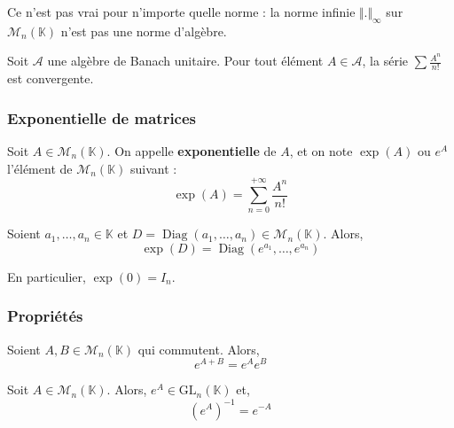   \begin{cexample}
    Ce n'est pas vrai pour n'importe quelle norme : la norme infinie $\Vert . \Vert_\infty$ sur $\mathcal{M}_n(\mathbb{K})$ n'est pas une norme d'algèbre.
  \end{cexample}


  \begin{proposition}
    Soit $\mathcal{A}$ une algèbre de Banach unitaire. Pour tout élément $A \in \mathcal{A}$, la série $\sum \frac{A^n}{n!}$ est convergente.
  \end{proposition}

  \subsubsection{Exponentielle de matrices}


  \begin{definition}
    Soit $A \in \mathcal{M}_n(\mathbb{K})$. On appelle \textbf{exponentielle} de $A$, et on note $\exp(A)$ ou $e^A$ l'élément de $\mathcal{M}_n(\mathbb{K})$ suivant :
    \[ \exp(A) = \sum_{n=0}^{+\infty} \frac{A^n}{n!} \]
  \end{definition}


  \begin{example}
    Soient $a_1, \dots, a_n \in \mathbb{K}$ et $D = \operatorname{Diag}(a_1, \dots, a_n) \in \mathcal{M}_n(\mathbb{K})$. Alors,
    \[ \exp(D) = \operatorname{Diag}(e^{a_1}, \dots, e^{a_n}) \]
  \end{example}


  \begin{remark}
    En particulier, $\exp(0) = I_n$.
  \end{remark}

  \subsubsection{Propriétés}

  \begin{proposition}
    Soient $A, B \in \mathcal{M}_n(\mathbb{K})$ qui commutent. Alors,
    \[ e^{A+B} = e^{A} e^{B} \]
  \end{proposition}

  \begin{corollary}
    Soit $A \in \mathcal{M}_n(\mathbb{K})$. Alors, $e^A \in \mathrm{GL}_n(\mathbb{K})$ et,
    \[ \left( e^A \right)^{-1} = e^{-A} \]
  \end{corollary}

